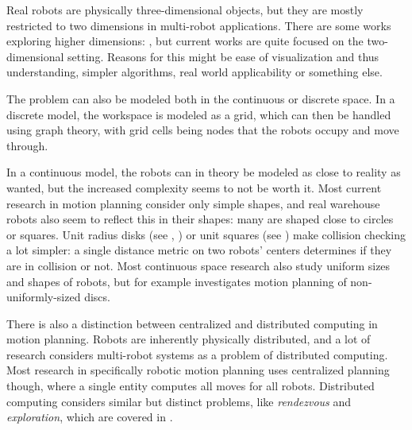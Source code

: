 Real robots are physically three-dimensional objects, but they are mostly restricted to two dimensions in multi-robot applications. There are some works exploring higher dimensions: \cite{arobots/TurpinMMK14}, but current works are quite focused on the two-dimensional setting. Reasons for this might be ease of visualization and thus understanding, simpler algorithms, real world applicability or something else.

The problem can also be modeled both in the continuous or discrete space. In a discrete model, the workspace is modeled as a grid, which can then be handled using graph theory, with grid cells being nodes that the robots occupy and move through.

In a continuous model, the robots can in theory be modeled as close to reality as wanted, but the increased complexity seems to not be worth it. Most current research in motion planning consider only simple shapes, and real warehouse robots also seem to reflect this in their shapes: many are shaped close to circles or squares. Unit radius disks (see \cite{siamcomp/DemaineFKMS19}, \cite{compgeom/BanyassadyBBBFH22}) or unit squares (see \cite{jea/YangV22}) make collision checking a lot simpler: a single distance metric on two robots' centers determines if they are in collision or not. Most continuous space research also study uniform sizes and shapes of robots, but for example \cite{fun/BrockenHKLS21} investigates motion planning of non-uniformly-sized discs.


There is also a distinction between centralized and distributed computing in motion planning. Robots are inherently physically distributed, and a lot of research considers multi-robot systems as a problem of distributed computing. Most research in specifically robotic motion planning uses centralized planning though, where a single entity computes all moves for all robots. Distributed computing considers similar but distinct problems, like \emph{rendezvous} and \emph{exploration}, which are covered in \cite{lncs/FlocchiniGN19}.






